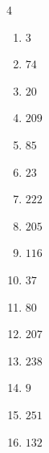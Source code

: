 \begin{multicols}{4}
\begin{enumerate}
  \item $3$


  \item $74$


  \item $20$


  \item $209$


  \item $85$


  \item $23$


  \item $222$


  \item $205$


\columnbreak %

  \item $116$


  \item $37$


  \item $80$


  \item $207$


  \item $238$


  \item $9$


  \item $251$


  \item $132$


\end{enumerate}
\end{multicols}
